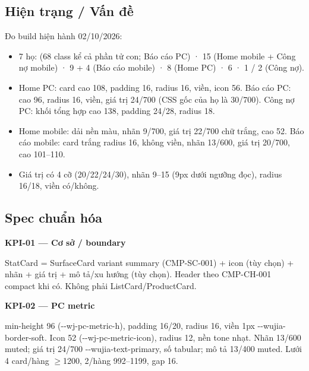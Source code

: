 \documentclass[11pt,a4paper]{report}
\begin{document}
\subsection*{Hiện trạng / Vấn đề}
Đo build hiện hành 02/\allowbreak{}10/\allowbreak{}2026:\par
\begin{itemize}
\item 7 họ:  (68 class kể cả phần tử con; Báo cáo PC) ·  15 (Home mobile + Công nợ mobile) ·  9 +  4 (Báo cáo mobile) ·  8 (Home PC) ·  6 ·  1 /  2 (Công nợ).
\item Home PC: card cao 108, padding 16, radius 16, viền, icon 56. Báo cáo PC: cao 96, radius 16, viền, giá trị 24/\allowbreak{}700 (CSS gốc của họ là 30/\allowbreak{}700). Công nợ PC: khối tổng hợp cao 138, padding 24/\allowbreak{}28, radius 18.
\item Home mobile: dải nền màu, nhãn 9/\allowbreak{}700, giá trị 22/\allowbreak{}700 chữ trắng, cao 52. Báo cáo mobile: card trắng radius 16, không viền, nhãn 13/\allowbreak{}600, giá trị 20/\allowbreak{}700, cao 101–110.
\item Giá trị có 4 cỡ (20/\allowbreak{}22/\allowbreak{}24/\allowbreak{}30), nhãn 9–15 (9px dưới ngưỡng đọc), radius 16/\allowbreak{}18, viền có/\allowbreak{}không.
\end{itemize}
\subsection*{Spec chuẩn hóa}
\par\smallskip\textbf{KPI-01 — Cơ sở / boundary}\par
StatCard = SurfaceCard variant summary (CMP-SC-001) + icon (tùy chọn) + nhãn + giá trị + mô tả/\allowbreak{}xu hướng (tùy chọn). Header theo CMP-CH-001 compact khi có. Không phải ListCard/\allowbreak{}ProductCard.\par

\par\smallskip\textbf{KPI-02 — PC metric}\par
min-\allowbreak{}height 96 (-\kern0pt-\allowbreak{}wj-\allowbreak{}pc-\allowbreak{}metric-\allowbreak{}h), padding 16/\allowbreak{}20, radius 16, viền 1px -\kern0pt-\allowbreak{}wujia-\allowbreak{}border-\allowbreak{}soft. Icon 52 (-\kern0pt-\allowbreak{}wj-\allowbreak{}pc-\allowbreak{}metric-\allowbreak{}icon), radius 12, nền tone nhạt. Nhãn 13/\allowbreak{}600 muted; giá trị 24/\allowbreak{}700 -\kern0pt-\allowbreak{}wujia-\allowbreak{}text-\allowbreak{}primary, số tabular; mô tả 13/\allowbreak{}400 muted. Lưới 4 card/\allowbreak{}hàng \(\geq\)1200, 2/\allowbreak{}hàng 992–1199, gap 16.\par
\end{document}
